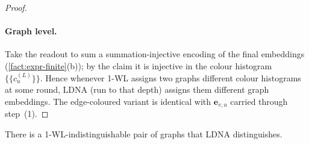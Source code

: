 \begin{proof}
\paragraph{Graph level.}
Take the readout to sum a summation-injective encoding of the final embeddings
(\cref{fact:expr-finite}(b)); by the claim it is injective in the colour
histogram $\{\!\{c_u^{(L)}\}\!\}$. Hence whenever 1-WL assigns two graphs
different colour histograms at some round, LDNA (run to that depth) assigns them
different graph embeddings. The edge-coloured variant is identical with
$\mathbf{e}_{v,u}$ carried through step~(1).
\end{proof}

\begin{lemma}[Separation]
\label{lem:expr-separate}
There is a 1-WL-indistinguishable pair of graphs that LDNA distinguishes.
\end{lemma}

